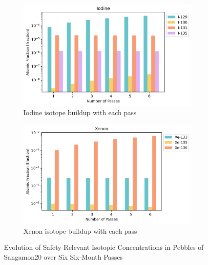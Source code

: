 \begin{figure}[H]
\centering
%
\begin{subfigure}{0.95\textwidth}
  \includegraphics[width=\linewidth]{figures/compositions/iodine}
  \caption{Iodine isotope buildup with each pass}
  \label{fig:i}
\end{subfigure}%

\begin{subfigure}{0.95\textwidth}
  \includegraphics[width=\linewidth]{figures/compositions/xenon}
  \caption{Xenon isotope buildup with each pass}
  \label{fig:xe}
\end{subfigure}%

\caption{Evolution of Safety Relevant Isotopic Concentrations in Pebbles of Sangamon20 over Six Six-Month Passes}
\end{figure}

